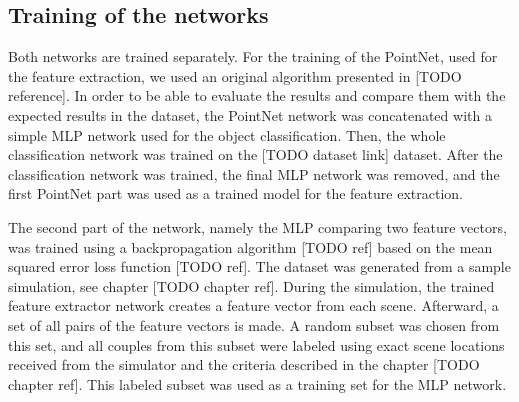 \subsection{Training of the networks}\label{section:nnTraining}

Both networks are trained separately. For the training of the PointNet, used for the feature extraction, we used an original algorithm presented in [TODO reference]. In order to be able to evaluate the results and compare them with the expected results in the dataset, the PointNet network was concatenated with a simple MLP network used for the object classification. Then, the whole classification network was trained on the [TODO dataset link] dataset. After the classification network was trained, the final MLP network was removed, and the first PointNet part was used as a trained model for the feature extraction.\par
The second part of the network, namely the MLP comparing two feature vectors, was trained using a backpropagation algorithm [TODO ref] based on the mean squared error loss function [TODO ref]. The dataset was generated from a sample simulation, see chapter [TODO chapter ref]. During the simulation, the trained feature extractor network creates a feature vector from each scene. Afterward, a set of all pairs of the feature vectors is made. A random subset was chosen from this set, and all couples from this subset were labeled using exact scene locations received from the simulator and the criteria described in the chapter [TODO chapter ref]. This labeled subset was used as a training set for the MLP network.
